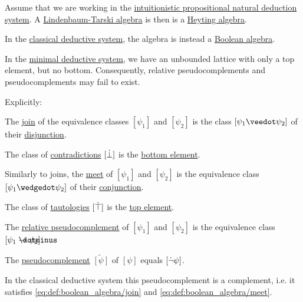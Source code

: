 \begin{proposition}\label{thm:intuitionistic_lindenbaum_tarski_algebra}
  Assume that we are working in the \hyperref[def:intuitionistic_propositional_deductive_systems]{intuitionistic propositional natural deduction system}. A \hyperref[def:lindenbaum_tarski_algebra]{Lindenbaum-Tarski algebra} is then is a \hyperref[def:heyting_algebra]{Heyting algebra}.

  In the \hyperref[def:classical_propositional_deductive_systems]{classical deductive system}, the algebra is instead a \hyperref[def:boolean_algebra]{Boolean algebra}.

  In the \hyperref[def:minimal_propositional_hilbert_system]{minimal deductive system}, we have an unbounded lattice with only a top element, but no bottom. Consequently, relative pseudocomplements and pseudocomplements may fail to exist.

  Explicitly:
  \begin{thmenum}
     The \hyperref[def:lattice/join]{join} of the equivalence classes \( [\psi_1] \) and \( [\psi_2] \) is the class \( [\psi_1 \synvee \psi_2] \) of their \hyperref[def:propositional_alphabet/connectives/disjunction]{disjunction}.

     The class of \hyperref[def:propositional_entailment/contradiction]{contradictions} \( [\dot\bot] \) is the \hyperref[def:extremal_points/top_and_bottom]{bottom element}.

     Similarly to joins, the \hyperref[def:lattice/meet]{meet} of \( [\psi_1] \) and \( [\psi_2] \) is the equivalence class \( [\psi_1 \synwedge \psi_2] \) of their \hyperref[def:propositional_alphabet/connectives/conjunction]{conjunction}.

     The class of \hyperref[def:propositional_entailment/tautology]{tautologies} \( [\dot\top] \) is the \hyperref[def:extremal_points/top_and_bottom]{top element}.

     The \hyperref[def:heyting_algebra]{relative pseudocomplement} of \( [\psi_1] \) and \( [\psi_2] \) is the equivalence class \( [\psi_1 \synimplies \psi_2] \).

     The \hyperref[eq:def:heyting_algebra/pseudocomplement]{pseudocomplement} \( \widetilde{[\psi]} \) of \( [\psi] \) equals \( [\dot\neg \psi] \).

    In the classical deductive system this pseudocomplement is a complement, i.e. it satisfies \eqref{eq:def:boolean_algebra/join} and \eqref{eq:def:boolean_algebra/meet}.
  \end{thmenum}
\end{proposition}

